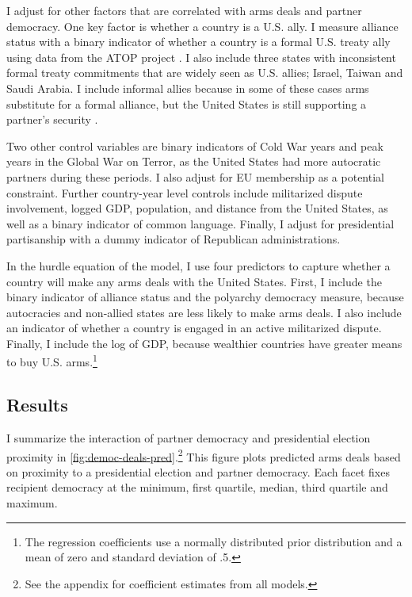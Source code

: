 \documentclass[12pt]{article}
\begin{document}
I adjust for other factors that are correlated with arms deals and partner democracy. 
One key factor is whether a country is a U.S. ally. 
I measure alliance status with a binary indicator of whether a country is a formal U.S. treaty ally using data from the ATOP project \citep{Leedsetal2002}.
I also include three states with inconsistent formal treaty commitments that are widely seen as U.S. allies; Israel, Taiwan and Saudi Arabia. 
I include informal allies because in some of these cases arms substitute for a formal alliance, but the United States is still supporting a partner's security \citep{Yarhi-Miloetal2016}. 


Two other control variables are binary indicators of Cold War years and peak years in the Global War on Terror, as the United States had more autocratic partners during these periods. 
I also adjust for EU membership as a potential constraint. 
Further country-year level controls include militarized dispute involvement, logged GDP, population, and distance from the United States, as well as a binary indicator of common language. 
Finally, I adjust for presidential partisanship with a dummy indicator of Republican administrations.  


In the hurdle equation of the model, I use four predictors to capture whether a country will make any arms deals with the United States. 
First, I include the binary indicator of alliance status and the polyarchy democracy measure, because autocracies and non-allied states are less likely to make arms deals. 
I also include an indicator of whether a country is engaged in an active militarized dispute. 
Finally, I include the log of GDP, because wealthier countries have greater means to buy U.S. arms.\footnote{The regression coefficients use a normally distributed prior distribution and a mean of zero and standard deviation of .5.}


\subsection{Results}


I summarize the interaction of partner democracy and presidential election proximity in \autoref{fig:democ-deals-pred}.\footnote{See the appendix for coefficient estimates from all models.}
This figure plots predicted arms deals based on proximity to a presidential election and partner democracy.
Each facet fixes recipient democracy at the minimum, first quartile, median, third quartile and maximum.
\end{document}
